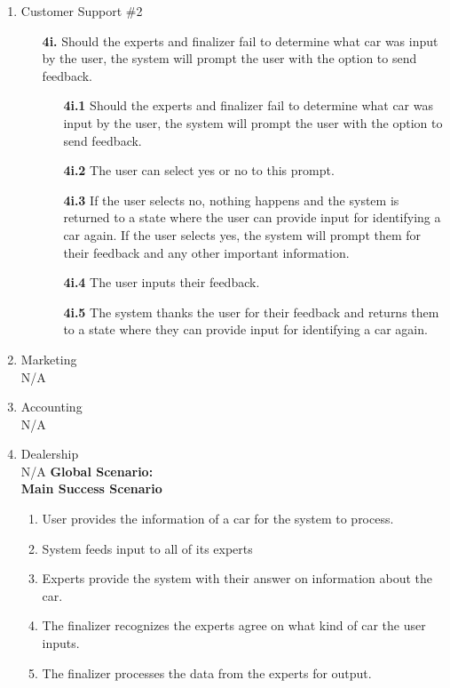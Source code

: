 \documentclass[]{article}
\begin{document}
\begin{enumerate}[label={\bf BE\arabic*}]
\begin{enumerate}[label={\bf VP\arabic*.}]
\begin{enumerate}
		\end{enumerate}
		\item Customer Support \#2
		\begin{enumerate}
			\color{red}
			\item[\textbf{4i.}] Should the experts and finalizer fail to determine what car was input by the user, the system will prompt the user with the option to send feedback.
			\begin{enumerate}
				\item[\textbf{4i.1}] Should the experts and finalizer fail to determine what car was input by the user, the system will prompt the user with the option to send feedback.
				\item[\textbf{4i.2}] The user can select yes or no to this prompt.
				\item[\textbf{4i.3}] If the user selects no, nothing happens and the system is returned to a state where the user can provide input for identifying a car again. If the user selects yes, the system will prompt them for their feedback and any other important information.
				\item[\textbf{4i.4}] The user inputs their feedback.
				\item[\textbf{4i.5}] The system thanks the user for their feedback and returns them to a state where they can provide input for identifying a car again.
			\end{enumerate}
		\end{enumerate}
		\item Marketing\\
		N/A
		\item Accounting\\
		N/A
		\item Dealership\\
		N/A
		{\bf Global Scenario:}\\
		\textbf{Main Success Scenario}
		\begin{enumerate}[label={\bf \arabic*.}]
			\color{red}
			\item User provides the information of a car for the system to process.
			\item System feeds input to all of its experts
			\item Experts provide the system with their answer on information about the car.
			\item The finalizer recognizes the experts agree on what kind of car the user inputs.
			\item The finalizer processes the data from the experts for output.

\end{enumerate}
\end{enumerate}
\end{enumerate}
\end{document}
